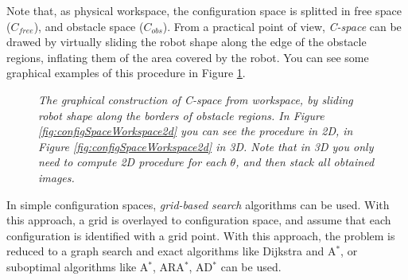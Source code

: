 Note that, as physical workspace, the configuration space is splitted in free space ($C_{free}$), and obstacle space ($C_{obs}$). From a practical point of view, \textit{C-space} can be drawed by virtually sliding the robot shape along the edge of the obstacle regions, inflating them of the area covered by the robot. You can see some graphical examples of this procedure in Figure \ref{fig:configSpaceWorkspace}.

\begin{figure}
	\centering
	\qquad
	\caption{\textit{The graphical construction of C-space from workspace, by sliding robot shape along the borders of obstacle regions. In Figure \ref{fig:configSpaceWorkspace2d} you can see the procedure in 2D, in Figure \ref{fig:configSpaceWorkspace2d} in 3D. Note that in 3D you only need to compute 2D procedure for each $\theta$, and then stack all obtained images.}}
	\label{fig:configSpaceWorkspace}
\end{figure}

In simple configuration spaces, \textit{grid-based search} algorithms can be used. With this approach, a grid is overlayed to configuration space, and assume that each configuration is identified with a grid point. With this approach, the problem is reduced to a graph search and exact algorithms like Dijkstra and A$^*$, or suboptimal algorithms like A$^*$, ARA$^*$, AD$^*$ can be used.

